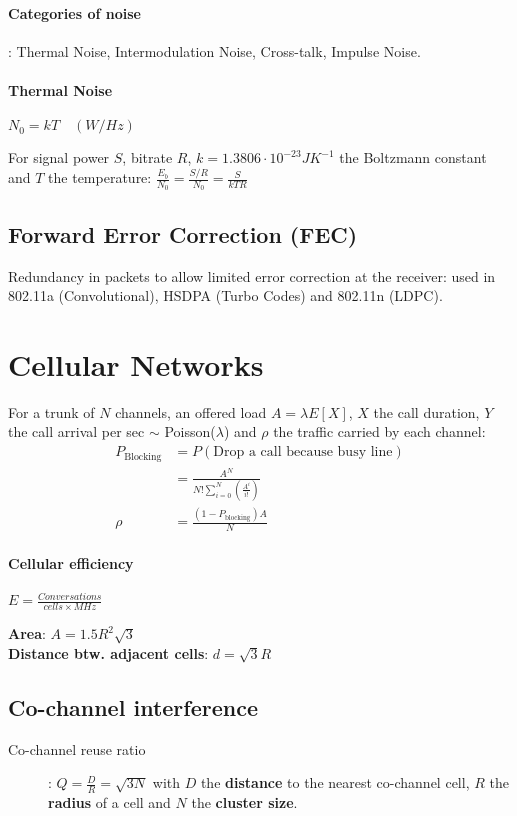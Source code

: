 \documentclass[6pt]{scrartcl}
\begin{document}
\begin{multicols}{4}
\paragraph{Categories of noise}: Thermal Noise, Intermodulation Noise, Cross-talk, Impulse Noise.
\paragraph{Thermal Noise}$N_0 = kT\quad(W/Hz)$

For signal power $S$, bitrate $R$, $k = 1.3806\cdot10^{-23} JK^{-1}$ the Boltzmann constant and $T$ the temperature: $\frac{E_b}{N_0} = \frac{S/R}{N_0} = \frac{S}{kTR}$

\subsection{Forward Error Correction (FEC)}
Redundancy in packets to allow limited error correction at the receiver: used in 802.11a (Convolutional), HSDPA (Turbo Codes) and 802.11n (LDPC).


\section{Cellular Networks}
For a trunk of $N$ channels, an offered load $A=\lambda E[X]$, $X$ the call duration, $Y$ the call arrival per sec $\sim$ Poisson($\lambda$) and $\rho$ the traffic carried by each channel: 
\begin{align*}
	P_\textrm{Blocking} &= P(\textrm{Drop a call because busy line})  \\
	&= \frac{A^N}{N!\sum^N_{i=0}(\frac{A^i}{i!})}\\
	\rho &= \frac{(1 - P_\textrm{blocking})A}{N}
\end{align*}


\paragraph{Cellular efficiency} $E = \frac{Conversations}{cells\times MHz}$


\textbf{Area}: $A=1.5R^2\sqrt{3}$\\
\textbf{Distance btw. adjacent cells}: $d=\sqrt{3}R$

\subsection{Co-channel interference}
\begin{description}
\item[Co-channel reuse ratio]: $Q = \frac{D}{R} = \sqrt{3N}$ with $D$ the \textbf{distance} to the nearest co-channel cell, $R$ the \textbf{radius} of a cell and $N$ the \textbf{cluster size}.


\end{description}
\end{multicols}
\end{document}
